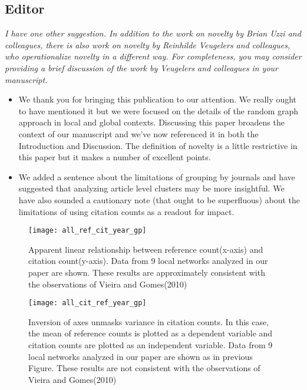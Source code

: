 \documentclass[11pt, oneside]{article}   	%
\begin{document}
\subsection{Editor}
\emph{I have one other suggestion. In addition to the work on novelty by Brian Uzzi and colleagues, there is also work on novelty by Reinhilde Veugelers and colleagues, who operationalize novelty in a different way. For completeness, you may consider providing a brief discussion of the work by Veugelers and colleagues in your manuscript.}
\begin{itemize}
\item We thank you for bringing this publication to our attention. We really ought to have mentioned it but we were focused on the details of the random graph approach in local and global contexts. Discussing this paper broadens the context of our manuscript and we've now referenced it in both the Introduction and Discussion. The definition of novelty is a little restrictive in this paper but it makes a number of excellent points.
\item We added a sentence about the limitations of grouping by journals and have suggested that analyzing article level clusters may be more insightful. We have also sounded a cautionary note (that ought to be superfluous) about the limitations of using citation counts as a readout for impact. \end{itemize}
 
 \newpage

\begin{figure}[tbhp]
\centering
\texttt{[image: all\_ref\_cit\_year\_gp]}     
\caption{Apparent linear relationship between reference count(x-axis) and citation count(y-axis). Data from 9 local networks analyzed in our paper are shown. These results are approximately consistent with the observations of Vieira and Gomes(2010)} 
\label{fig:refcit}
\end{figure}
\newpage

\begin{figure}[tbhp]
\centering
\texttt{[image: all\_cit\_ref\_year\_gp]}     
\caption{Inversion of axes unmasks variance in citation counts. In this case, the mean of reference counts is plotted as a dependent variable and citation counts are plotted as an independent variable. Data from 9 local networks analyzed in our paper are shown as in previous Figure. These results are not consistent with the observations  of Vieira and Gomes(2010)} 
\label{fig:citref}
\end{figure}
\newpage
\end{document}
